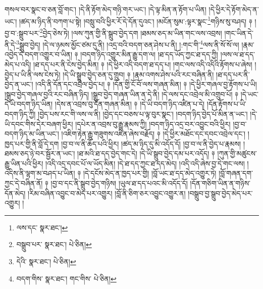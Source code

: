 གསལ་བར་སྣང་བ་ཅན་བློ་གང་། །དེ་ནི་རྟོག་མེད་གཉི་གར་ཡང་། །དེ་ལྟ་མིན་ན་རྟོག་པ་ཡིན། །དེ་ཕྱིར་དེ་རྟོག་མེད་ན་ཡང་། །ཚད་མ་ཉིད་ནི་བཀག་པ་སྟེ། །བསླུ་བའི་ཕྱིར་རོ་དེ་དོན་དུའང་། །མངོན་སུམ་:ལྟར་སྣང་\footnote{ལས་དང་  སྣར་ཐང་། }གཉིས་སུ་བཤད། ༈ །བྱ་བ་:སྒྲུབ་པར་\footnote{བསྒྲུབ་པར་  སྣར་ཐང་།  པེ་ཅིན། }བྱེད་ཅེས་ཏེ། །ལས་ཀུན་གྱི་ནི་སྒྲུབ་བྱེད་དག །ཐམས་ཅད་མ་ཡིན་གང་ལས་འབྲས། །གང་ཡིན་དེ་ནི་དེ་\footnote{དེའི་  སྣར་ཐང་།  པེ་ཅིན། }སྒྲུབ་བྱེད། །དེ་ལ་ཉམས་མྱོང་ཙམ་དུ་ནི། །འདྲ་བའི་བདག་ཅན་ཤེས་པ་ནི། །:གང་གི་\footnote{བདག་གིས་  སྣར་ཐང་། གང་གིས་  པེ་ཅིན། }ལས་ནི་སོ་སོ་ལ། །རྣམ་འབྱེད་དེ་བདག་འགྱུར་བ་ཡིན། ༈ །བདག་ཉིད་འགྱུར་མིན་རྒྱུ་དག་ལ། །ཐ་དད་ཡོད་ཀྱང་ཐ་དད་ཀྱི། །ལས་ལ་ཐ་དད་མེད་པ་འདི། །ཐ་དད་པར་ནི་ངེས་བྱེད་མིན། ༈ །དེ་ཕྱིར་འདི་བདག་ཐ་དད་པ། །གང་ལས་འདི་འདིའི་རྟོགས་པ་ཞེས། །བྱེད་པ་ཡི་ནི་ལས་ངེས་ཏེ། །དེ་ཡི་སྒྲུབ་བྱེད་ཅན་དུ་གྲུབ། ༈ །རྣམ་འགས་ཤེས་པའི་རང་བཞིན་ནི། །ཐ་དད་པར་ནི་བྱེད་ན་ཡང་། །འདི་ནི་དོན་དང་འབྲེལ་བྱེད་པ། ༈ །དོན་གྱི་ངོ་བོ་ལས་གཞན་མིན། ༈ །དེ་ཕྱིར་གཞལ་བྱ་རྟོགས་པ་ཡི། །སྒྲུབ་བྱེད་གཞལ་བྱའི་རང་བཞིན་ཉིད། །སྒྲུབ་བྱེད་གཞན་ཡིན་ན་དེ་ནི། །དེ་ལས་དང་འབྲེལ་མི་འགྲུབ་པོ། ༈ །དེ་ཡང་དེ་ཡི་བདག་ཉིད་ཡིན། །དེས་ན་འབྲས་བུ་དོན་གཞན་མིན། ༈ །དེ་ཡི་བདག་ཉིད་འཛིན་པ་དེ། །དོན་རྟོགས་པ་ཡི་བདག་ཉིད་ཀྱི། །བྱེད་པས་རང་གི་ལས་ལ་ནི། །བྱེད་དང་བཅས་པ་ལྟ་བུར་སྣང་། །བདག་ཉིད་བྱེད་པོ་མིན་ན་ཡང་། །དེ་ཡི་དབང་གིས་དེར་བཞག་ཕྱིར། །དཔེར་ན་འབྲས་བུ་རྒྱུ་རྣམས་ཀྱི། །བདག་ཉིད་འདྲ་བར་འབྱུང་བའི་ཕྱིར། །བྱ་བ་བདག་ཉིད་མ་ཡིན་ཡང་། །འཇིག་རྟེན་རྒྱུ་གཟུགས་འཛིན་ཞེས་བརྗོད། ༈ །དེ་ཕྱིར་མཐོང་དང་དབང་འབྲེལ་དང་། །ཁྱད་པར་གྱི་ནི་བློ་དེ་དག །བྱ་བ་ལ་ནི་ཆོད་པའི་ཕྱིར། །ཚད་མ་ཉིད་དུ་མི་འདོད་དོ། །བྱ་བ་ལ་ནི་བྱེད་པ་རྣམས། །ཐམས་ཅད་ཉེ་བར་སྦྱོར་ན་ཡང་། །ཐ་མའི་ཐ་དད་བྱེད་གང་དེ། །དེ་ཡི་སྒྲུབ་བྱེད་དམ་པར་འདོད། ༈ །ཀུན་གྱི་མཚུངས་རྒྱུ་ཡིན་པའི་ཕྱིར། །འདི་འདྲ་དབང་པོ་ལ་ཡོད་མིན། །དེ་ཐ་དད་ཀྱང་ཐ་དད་མེད། །འདི་འདི་ཞེས་བྱ་དེ་གང་ལས། །འདིས་ནི་ལྷག་མ་བཤད་པ་ཡིན། ༈ །དེ་དངོས་མེད་ན་ཁྱད་པར་གྱི། །བློ་ཡང་ཐ་དད་མེད་འགྱུར་ཏེ། །བློ་གཞན་དག་ཀྱང་དེ་བཞིན་ནོ། ༈ །བྱ་བ་དང་ནི་སྒྲུབ་བྱེད་གཉིས། །ཡུལ་ཐ་དད་པའང་མི་འདོད་དོ། །དོན་གཅིག་ཡིན་ན་གཉིས་དོན་མེད། །རིམ་བཞིན་འབྱུང་བ་མེད་པར་འགྱུར། །བློ་ནི་ཅིག་ཅར་འབྱུང་འགྱུར་ན། །བསྒྲུབ་བྱ་སྒྲུབ་བྱེད་མེད་པར་འགྱུར། །
